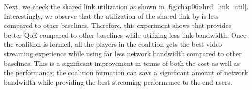 Next, we check the shared link utilization as shown in \fig\ref{fig:chap06:shrd_link_util}. Interestingly, we observe that the utilization of the shared link by {\our} is less compared to other baselines. Therefore, this experiment shows that {\our} provides better \ac{QoE} compared to other baselines while utilizing less link bandwidth. Once the coalition is formed, all the players in the coalition gets the best video streaming experience while using far less network bandwidth compared to other baselines. This is a significant improvement in terms of both the cost as well as the performance; the coalition formation can save a significant amount of network bandwidth while providing the best streaming performance to the end users.